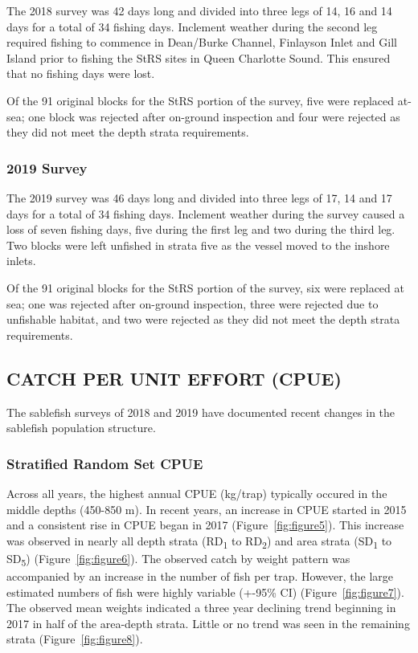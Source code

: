 \documentclass[12pt]{article}\usepackage[]{graphicx}\usepackage[]{color}
\begin{document}
The 2018 survey was 42 days long and divided into three legs of 14, 16 and 14 days for a total of 34 fishing days. Inclement weather during the second leg required fishing to commence in Dean/Burke Channel, Finlayson Inlet and Gill Island prior to fishing the StRS sites in Queen Charlotte Sound. This ensured that no fishing days were lost.

Of the 91 original blocks for the StRS portion of the survey, five were replaced at-sea; one block was rejected after on-ground inspection and four were rejected as they did not meet the depth strata requirements.

\hypertarget{survey-1}{%
\subsubsection{2019 Survey}\label{survey-1}}

The 2019 survey was 46 days long and divided into three legs of 17, 14 and 17 days for a total of 34 fishing days. Inclement weather during the survey caused a loss of seven fishing days, five during the first leg and two during the third leg. Two blocks were left unfished in strata five as the vessel moved to the inshore inlets.

Of the 91 original blocks for the StRS portion of the survey, six were replaced at sea; one was rejected after on-ground inspection, three were rejected due to unfishable habitat, and two were rejected as they did not meet the depth strata requirements.

\hypertarget{catch-per-unit-effort-cpue}{%
\subsection{CATCH PER UNIT EFFORT (CPUE)}\label{catch-per-unit-effort-cpue}}

The sablefish surveys of 2018 and 2019 have documented recent changes in the sablefish population structure.

\hypertarget{stratified-random-set-cpue}{%
\subsubsection{Stratified Random Set CPUE}\label{stratified-random-set-cpue}}

Across all years, the highest annual CPUE (kg/trap) typically occured in the middle depths (450-850 m). In recent years, an increase in CPUE started in 2015 and a consistent rise in CPUE began in 2017 (Figure~\ref{fig:figure5}). This increase was observed in nearly all depth strata (RD\textsubscript{1} to RD\textsubscript{2}) and area strata (SD\textsubscript{1} to SD\textsubscript{5}) (Figure~\ref{fig:figure6}). The observed catch by weight pattern was accompanied by an increase in the number of fish per trap. However, the large estimated numbers of fish were highly variable (+-95\% CI) (Figure~\ref{fig:figure7}). The observed mean weights indicated a three year declining trend beginning in 2017 in half of the area-depth strata. Little or no trend was seen in the remaining strata (Figure~\ref{fig:figure8}).
\end{document}
